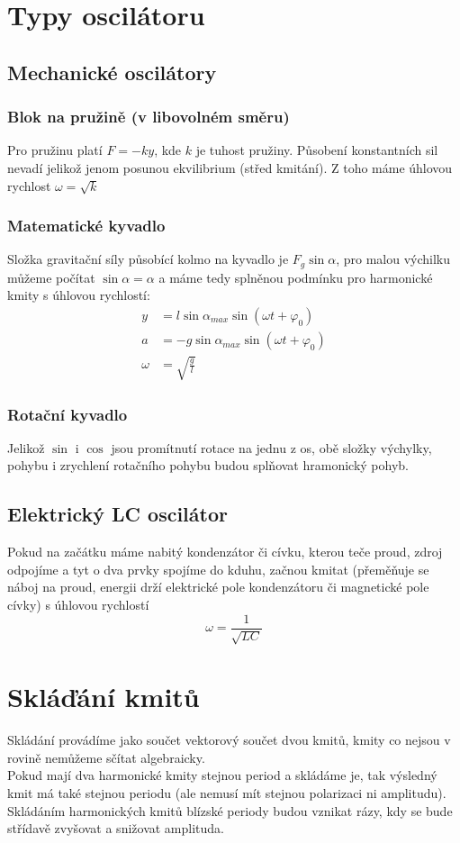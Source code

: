 \documentclass[titlepage]{report}
\begin{document}
\section{Typy oscilátoru}
\subsection{Mechanické oscilátory}
\subsubsection{Blok na pružině (v libovolném směru)}
Pro pružinu platí $F = -ky$, kde $k$ je tuhost pružiny. Působení konstantních sil nevadí jelikož jenom posunou ekvilibrium (střed kmitání). Z toho máme úhlovou rychlost $\omega = \sqrt{k}$\\
\subsubsection{Matematické kyvadlo}
Složka gravitační síly působící kolmo na kyvadlo je $F_g \sin \alpha$, pro malou výchilku můžeme počítat $\sin \alpha = \alpha$ a máme tedy splněnou podmínku pro harmonické kmity s úhlovou rychlostí:
\begin{align}
y &= l \sin \alpha_{max} \sin(\omega t + \varphi_0)\\
a &= - g \sin \alpha_{max} \sin(\omega t + \varphi_0)\\
\omega &= \sqrt{\frac{g}{l}}
\end{align}
\subsubsection{Rotační kyvadlo}
Jelikož $\sin$ i $\cos$ jsou promítnutí rotace na jednu z os, obě složky výchylky, pohybu i zrychlení rotačního pohybu budou splňovat hramonický pohyb.
\subsection{Elektrický LC oscilátor}
Pokud na začátku máme nabitý kondenzátor či cívku, kterou teče proud, zdroj odpojíme a tyt o dva prvky spojíme do kduhu, začnou kmitat (přeměňuje se náboj na proud, energii drží elektrické pole kondenzátoru či magnetické pole cívky) s úhlovou rychlostí\\
\begin{equation}
\omega = \frac{1}{\sqrt{LC}}
\end{equation}
\section{Skláďání kmitů}
Skládání provádíme jako součet vektorový součet dvou kmitů, kmity co nejsou v rovině nemůžeme sčítat algebraicky.\\
Pokud mají dva harmonické kmity stejnou period a skládáme je, tak výsledný kmit má také stejnou periodu (ale nemusí mít stejnou polarizaci ni amplitudu).\\
Skládáním harmonických kmitů blízské periody budou vznikat rázy, kdy se bude střídavě zvyšovat a snižovat amplituda.
\end{document}

